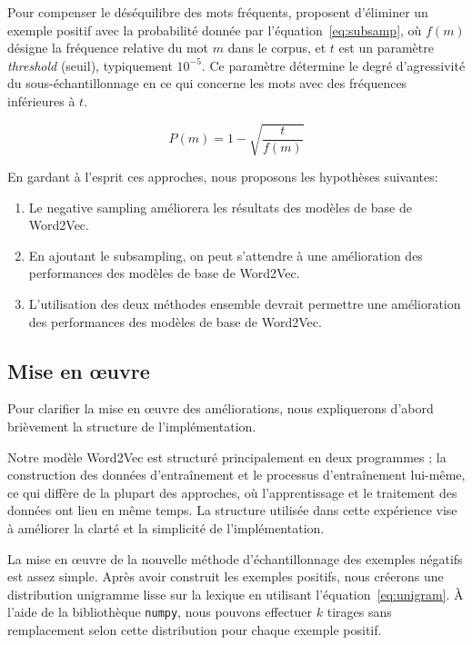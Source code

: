 \documentclass[12pt]{article}
\begin{document}
Pour compenser le déséquilibre des mots fréquents, \cite{DBLP:conf/nips/MikolovSCCD13} proposent d'éliminer un exemple positif avec la probabilité donnée par l'équation~\ref{eq:subsamp}, où $f(m)$ désigne la fréquence relative du mot $m$ dans le corpus, et $t$ est un paramètre \textit{threshold} (seuil), typiquement $10^{-5}$. Ce paramètre détermine le degré d'agressivité du sous-échantillonnage en ce qui concerne les mots avec des fréquences inférieures à $t$.

\begin{equation}\label{eq:subsamp}
P(m) = 1 - \sqrt{\frac{t}{f(m)}}
\end{equation}

En gardant à l'esprit ces approches, nous proposons les hypothèses suivantes:

\begin{enumerate}
    \item Le negative sampling améliorera les résultats des modèles de base de Word2Vec.
    \item En ajoutant le subsampling, on peut s'attendre à une amélioration des performances des modèles de base de Word2Vec.
    \item L'utilisation des deux méthodes ensemble devrait permettre une amélioration des performances des modèles de base de Word2Vec.
\end{enumerate}

\subsection{Mise en œuvre} \label{mise en œuvre-1}

Pour clarifier la mise en œuvre des améliorations, nous expliquerons d'abord brièvement la structure de l'implémentation. 

Notre modèle Word2Vec est structuré principalement en deux programmes ; la construction des données d'entraînement et le processus d'entraînement lui-même, ce qui diffère de la plupart des approches, où l'apprentissage et le traitement des données ont lieu en même temps. La structure utilisée dans cette expérience vise à améliorer la clarté et la simplicité de l'implémentation.

La mise en œuvre de la nouvelle méthode d'échantillonnage des exemples négatifs est assez simple. Après avoir construit les exemples positifs, nous créerons une distribution unigramme lisse sur la lexique en utilisant l'équation~\ref{eq:unigram}. À l'aide de la bibliothèque \texttt{numpy}, nous pouvons effectuer $k$ tirages sans remplacement selon cette distribution pour chaque exemple positif.
\end{document}
